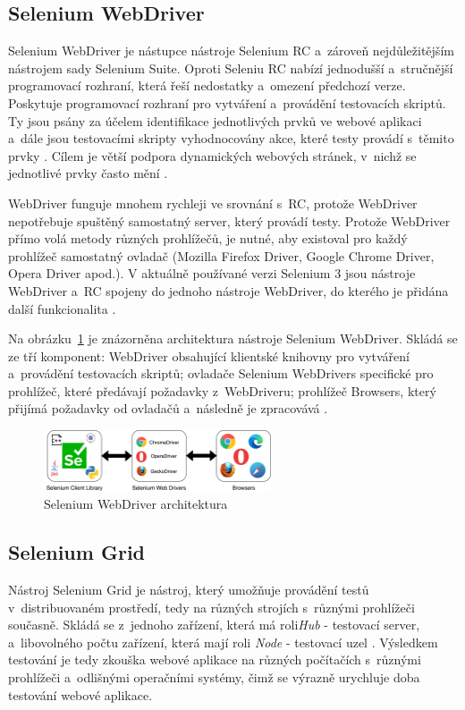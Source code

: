 \subsection*{Selenium WebDriver}
\label{sec:selenium_webdriver}
Selenium WebDriver je nástupce nástroje Selenium RC a~zároveň nejdůležitějším nástrojem sady Selenium Suite. Oproti Seleniu RC nabízí jednodušší a~stručnější programovací rozhraní, která řeší nedostatky a~omezení předchozí verze. Poskytuje programovací rozhraní pro vytváření a~provádění testovacích skriptů. Ty jsou psány za účelem identifikace jednotlivých prvků ve webové aplikaci a~dále jsou testovacími skripty vyhodnocovány akce, které testy provádí s~těmito prvky \cite{bib:selenium_grid}. Cílem je větší podpora dynamických webových stránek, v~nichž se jednotlivé prvky často mění \cite{bib:selenium_tool_suite}.

WebDriver funguje mnohem rychleji ve srovnání s~RC, protože WebDriver nepotřebuje spuštěný samostatný server, který provádí testy. Protože WebDriver přímo volá metody různých prohlížečů, je nutné, aby existoval pro každý prohlížeč samostatný ovladač (Mozilla Firefox Driver, Google Chrome Driver, Opera Driver apod.). V aktuálně používané verzi Selenium 3 jsou nástroje WebDriver a~RC spojeny do jednoho nástroje WebDriver, do kterého je přidána další funkcionalita \cite{bib:selenium_tool_suite}.

Na obrázku~\ref{img:selenium_webdriver} je znázorněna architektura nástroje Selenium WebDriver. Skládá se ze tří komponent: WebDriver obsahující klientské knihovny pro vytváření a~provádění testovacích skriptů; ovladače Selenium WebDrivers specifické pro prohlížeč, které předávají požadavky z~WebDriveru; prohlížeč Browsers, který přijímá požadavky od ovladačů a~následně je zpracovává \cite{bib:selenium_webdrivers}.

\begin{figure}[hbt]
	\centering
	\includegraphics[width=0.6\textwidth]{images/selenium_webdriver.jpg}
	\caption{Selenium WebDriver architektura}
	\label{img:selenium_webdriver}
\end{figure}

\subsection*{Selenium Grid}
Nástroj Selenium Grid je nástroj, který umožňuje provádění testů v~distribuovaném prostředí, tedy na různých strojích s~různými prohlížeči současně. Skládá se z~jednoho zařízení, která má roli\emph{Hub} - testovací server, a~libovolného počtu zařízení, která mají roli \emph{Node} - testovací uzel \cite{bib:selenium_grid}. Výsledkem testování je tedy zkouška webové aplikace na různých počítačích s~různými prohlížeči a~odlišnými operačními systémy, čimž se výrazně urychluje doba testování webové aplikace.

